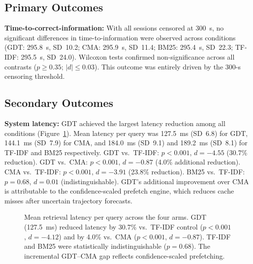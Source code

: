 \documentclass[11pt]{article}
\begin{document}
\subsection{Primary Outcomes}

\textbf{Time-to-correct-information:} With all sessions censored at 300~s, no significant differences in time-to-information were observed across conditions (GDT: 295.8~s, SD~10.2; CMA: 295.9~s, SD~11.4; BM25: 295.4~s, SD~22.3; TF-IDF: 295.5~s, SD~24.0). Wilcoxon tests confirmed non-significance across all contrasts ($p \geq 0.35$; $|d| \leq 0.03$). This outcome was entirely driven by the 300-s censoring threshold.

\subsection{Secondary Outcomes}

\textbf{System latency:} GDT achieved the largest latency reduction among all conditions (Figure~\ref{fig:latency}). Mean latency per query was 127.5~ms (SD~6.8) for GDT, 144.1~ms (SD~7.9) for CMA, and 184.0~ms (SD~9.1) and 189.2~ms (SD~8.1) for TF-IDF and BM25 respectively. GDT vs.\ TF-IDF: $p < 0.001$, $d = -4.55$ (30.7\% reduction). GDT vs.\ CMA: $p < 0.001$, $d = -0.87$ (4.0\% additional reduction). CMA vs.\ TF-IDF: $p < 0.001$, $d = -3.91$ (23.8\% reduction). BM25 vs.\ TF-IDF: $p = 0.68$, $d = 0.01$ (indistinguishable). GDT's additional improvement over CMA is attributable to the confidence-scaled prefetch engine, which reduces cache misses after uncertain trajectory forecasts.

\begin{figure}[htbp]
  \centering
  \caption{Mean retrieval latency per query across the four arms. GDT (127.5~ms) reduced latency by 30.7\% vs.\ TF-IDF control ($p<0.001$, $d=-4.12$) and by 4.0\% vs.\ CMA ($p<0.001$, $d=-0.87$). TF-IDF and BM25 were statistically indistinguishable ($p=0.68$). The incremental GDT--CMA gap reflects confidence-scaled prefetching.}
  \label{fig:latency}
\end{figure}
\end{document}
